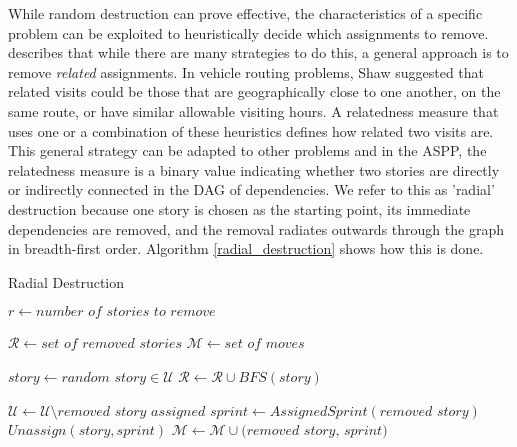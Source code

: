 While random destruction can prove effective, the characteristics of a specific problem can be exploited to heuristically decide which assignments to remove. \citet{shaw1998using} describes that while there are many strategies to do this, a general approach is to remove \textit{related} assignments. In vehicle routing problems, Shaw suggested that related visits could be those that are geographically close to one another, on the same route, or have similar allowable visiting hours. A relatedness measure that uses one or a combination of these heuristics defines how related two visits are. This general strategy can be adapted to other problems and in the ASPP, the relatedness measure is a binary value indicating whether two stories are directly or indirectly connected in the DAG of dependencies. We refer to this as 'radial' destruction because one story is chosen as the starting point, its immediate dependencies are removed, and the removal radiates outwards through the graph in breadth-first order. Algorithm \ref{radial_destruction} shows how this is done.

\begin{algorithm}[H]
\caption{Radial Destruction}\label{radial_destruction}
\begin{algorithmic}[1]
    \State $r \gets \textit{number of stories to remove}$
    
        \State $\mathcal{R} \gets \textit{set of removed stories}$
        \State $\mathcal{M} \gets \textit{set of moves}$
        
            \State $story \gets \textit{random story} \in \mathcal{U}$
            \State $\mathcal{R} \gets \mathcal{R} \cup BFS(story)$
            
                \State $\mathcal{U} \gets \mathcal{U} \setminus \textit{removed story}$
                \State $\textit{assigned sprint} \gets AssignedSprint(\textit{removed story})$
                \State $Unassign(story, sprint)$
                \State $\mathcal{M} \gets \mathcal{M} \cup \textit{(removed story, sprint)}$
            \EndFor
        \EndWhile
        
        \State {}
    \EndProcedure
\end{algorithmic}
\end{algorithm}

